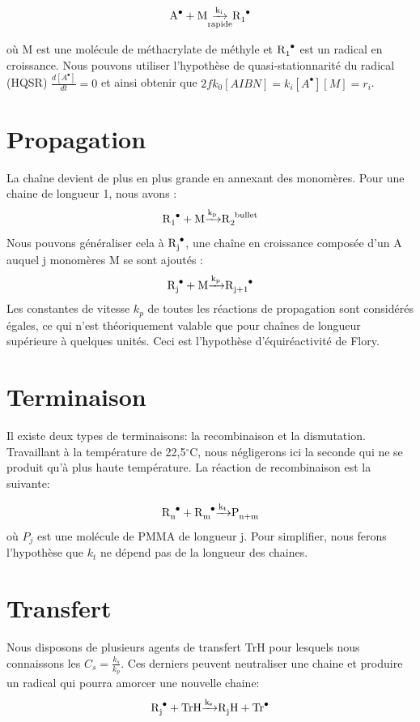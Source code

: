\documentclass[a4paper,oneside,12pt]{article}
\begin{document}
\begin{equation}
\ce{A^{\bullet} + M \underset{rapide}{\xrightarrow{k_i}} R1^{\bullet}}
\label{2}
\end{equation}

où M est une molécule de méthacrylate de méthyle et $\ce{R_1^{\bullet}}$ est un radical en croissance. Nous pouvons utiliser l'hypothèse de quasi-stationnarité du radical (HQSR) $\frac{d[A^{\bullet}]}{dt}=0$ et ainsi obtenir que $2fk_{0}[AIBN]=k_{i}[A^{\bullet}][M]=r_i$.

\section{Propagation}
La chaîne devient de plus en plus grande en annexant des monomères. Pour une chaine de longueur 1, nous avons :
\begin{equation}
\ce{R1^{\bullet} + M \xrightarrow{k_p} R2^{bullet}}
\end{equation}
Nous pouvons généraliser cela à $\ce{R_j^{\bullet}}$, une chaîne en croissance composée d'un A auquel j monomères M se sont ajoutés :
\begin{equation}
\ce{R_j^{\bullet} + M \xrightarrow{k_p} R_{j+1}^{\bullet}}
\end{equation}
Les constantes de vitesse $k_{p}$ de toutes les réactions de propagation sont considérés égales, ce qui n'est théoriquement valable que pour chaînes de longueur supérieure à quelques unités. Ceci est l'hypothèse d'équiréactivité de Flory.

\section{Terminaison}
Il existe deux types de terminaisons: la recombinaison et la dismutation. Travaillant à la température de 22,5$^{\circ}$C, nous négligerons ici la seconde qui ne se produit qu'à plus haute température. La réaction de recombinaison est la suivante:

\begin{equation}
\ce{R_{n}^{\bullet} + R_{m}^{\bullet} \xrightarrow{k_t} P_{n+m}}
\end{equation}
où $P_{j}$ est une molécule de PMMA de longueur j. Pour simplifier, nous ferons l'hypothèse que $k_{t}$ ne dépend pas de la longueur des chaines.

\section{Transfert}
Nous disposons de plusieurs agents de transfert TrH pour lesquels nous connaissons les $C_{s}=\frac{k_{s}}{k_{p}}$. Ces derniers peuvent neutraliser une chaine et produire un radical qui pourra amorcer une nouvelle chaine:
\begin{equation}
\ce{R_{j}^{\bullet} + TrH \xrightarrow{k_s} R_{j}H + Tr^{\bullet}}
\end{equation}
\end{document}
